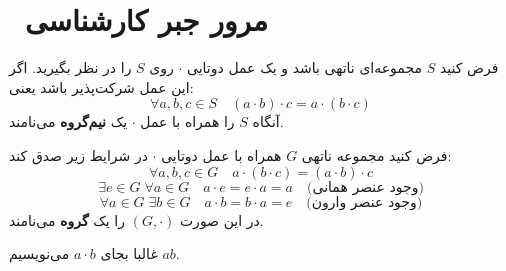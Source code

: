 

\section{ مرور جبر کارشناسی}


\begin{frame}
    \begin{definition}
        فرض کنید \( S \) مجموعه‌ای ناتهی باشد و یک عمل دوتایی \(\cdot\) روی \( S \) را در نظر بگیرید.
        اگر این عمل شرکت‌پذیر باشد یعنی:
        \[
            \forall a, b, c \in S \quad (a \cdot b) \cdot c = a \cdot (b \cdot c)
        \]
        آنگاه \( S \) را همراه با عمل \(\cdot\) یک \textbf{نیم‌گروه } می‌نامند.

    \end{definition}


\end{frame}

\begin{frame}
    \begin{definition}[گروه]
        فرض کنید مجموعه ناتهی \( G \) همراه با عمل دوتایی \(\cdot\) در شرایط زیر صدق کند:
        \[\forall a, b, c \in G \quad a \cdot (b \cdot c) = (a \cdot b) \cdot c\]
        \[\exists e \in G \; \forall a \in G \quad a \cdot e = e \cdot a = a \quad \text{(وجود عنصر همانی)}\]
        \[\forall a \in G \; \exists b \in G \quad a \cdot b = b \cdot a = e \quad \text{(وجود عنصر وارون)}\]
        در این صورت \( (G, \cdot) \) را یک \textbf{گروه} می‌نامند.

    \end{definition}
    \begin{remark}
        غالبا  بجای \( a \cdot b \) می‌نویسیم \( ab \).

    \end{remark}
\end{frame}

